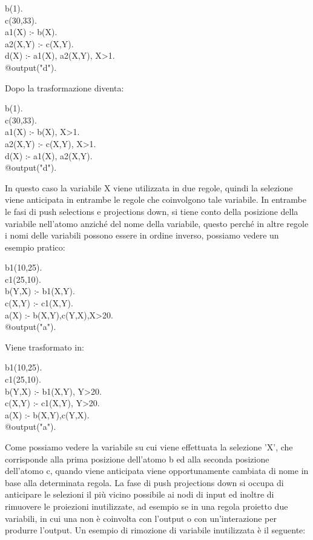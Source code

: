 \begin{algorithm}[h]
	b(1). \\
	c(30,33). \\
	a1(X) :- b(X). \\
	a2(X,Y) :- c(X,Y). \\
	d(X) :- a1(X), a2(X,Y), X>1. \\
	@output("d").
\end{algorithm}

Dopo la trasformazione diventa: 

\begin{algorithm}[h]
	b(1). \\
	c(30,33). \\
	a1(X) :- b(X), X>1. \\
	a2(X,Y) :- c(X,Y), X>1. \\
	d(X) :- a1(X), a2(X,Y). \\
	@output("d").
\end{algorithm} 

In questo caso la variabile X viene utilizzata in due regole, quindi la selezione viene anticipata in entrambe le regole che coinvolgono tale variabile. \newline
In entrambe le fasi di push selections e projections down, si tiene conto della posizione della variabile nell'atomo anziché del nome della variabile, questo perché in altre regole i nomi delle variabili possono essere in ordine inverso, possiamo vedere un esempio pratico:

\begin{algorithm}[h]
	b1(10,25). \\
	c1(25,10). \\
	b(Y,X) :- b1(X,Y). \\
	c(X,Y) :- c1(X,Y). \\
	a(X) :- b(X,Y),c(Y,X),X>20. \\
	@output("a").
\end{algorithm}

Viene trasformato in:

\begin{algorithm}[h]
	b1(10,25). \\
	c1(25,10). \\
	b(Y,X) :- b1(X,Y), Y>20. \\
	c(X,Y) :- c1(X,Y), Y>20. \\
	a(X) :- b(X,Y),c(Y,X). \\
	@output("a").
\end{algorithm}

Come possiamo vedere la variabile su cui viene effettuata la selezione 'X', che corrisponde alla prima posizione dell'atomo b ed alla seconda posizione dell'atomo c, quando viene anticipata viene opportunamente cambiata di nome in base alla determinata regola. \newline \newline
La fase di push projections down si occupa di anticipare le selezioni il più vicino possibile ai nodi di input ed inoltre di rimuovere le proiezioni inutilizzate, ad esempio se in una regola proietto due variabili, in cui una non è coinvolta con l'output o con un'interazione per produrre l'output. Un esempio di rimozione di variabile inutilizzata è il seguente:

